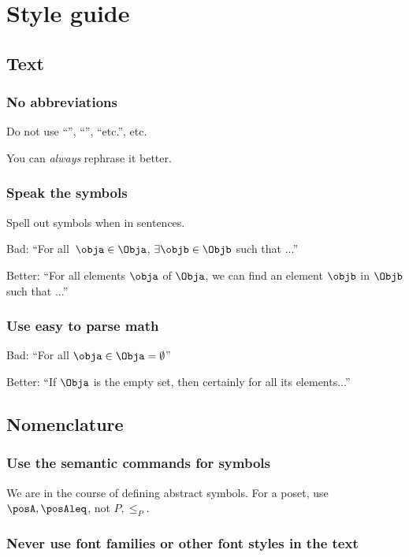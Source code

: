\section*{Style guide}
\subsection*{Text}
\subsubsection*{No abbreviations}
Do not use ``\ie '', ``\eg '', ``etc.'', etc.

You can \emph{always} rephrase it better.

\subsubsection*{Speak the symbols}
Spell out symbols when in sentences.

Bad: ``For all~$\obja\in \Obja$, $\exists \objb \in \Objb$ such that ...''

Better: ``For all elements $\obja$ of $\Obja$, we can find an element $\objb$ in $\Objb$ such that ...''

\subsubsection*{Use easy to parse math}

Bad: ``For all $\obja\in \Obja=\emptyset$''

Better: ``If $\Obja$ is the empty set, then certainly for all its elements...''

\subsection*{Nomenclature}

\subsubsection*{Use the semantic commands for symbols}

We are in the course of defining abstract symbols.
For a poset, use $\posA,\posAleq$, not $P,\leq_P$.


\subsubsection*{Never use font families or other font styles in the text}

